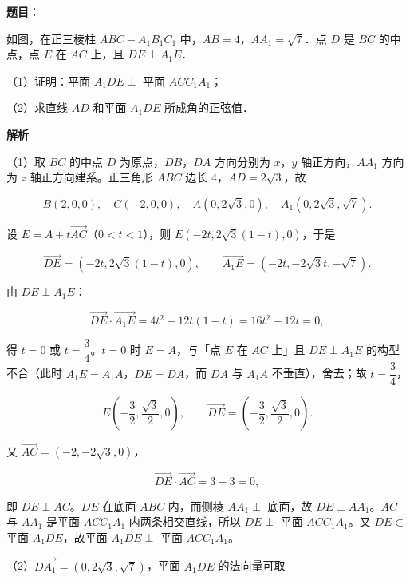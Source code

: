 \begin{answer}

\textbf{题目}：

如图，在正三棱柱 $ABC-A_1B_1C_1$ 中，$AB=4$，$AA_1=\sqrt7$．点 $D$ 是 $BC$ 的中点，点 $E$ 在 $AC$ 上，且 $DE\perp A_1E$．

（1）证明：平面 $A_1DE\perp$ 平面 $ACC_1A_1$；

（2）求直线 $AD$ 和平面 $A_1DE$ 所成角的正弦值．
\nopagebreak[4]
\begin{center}\end{center}
\nopagebreak[4]
\textbf{解析}

（1）取 $BC$ 的中点 $D$ 为原点，$DB$，$DA$ 方向分别为 $x$，$y$ 轴正方向，$AA_1$ 方向为 $z$ 轴正方向建系。正三角形 $ABC$ 边长 $4$，$AD=2\sqrt3$，故

\nopagebreak[4]
\[B(2,0,0),\quad C(-2,0,0),\quad A(0,2\sqrt3,0),\quad A_1(0,2\sqrt3,\sqrt7).\]

设 $E=A+t\overrightarrow{AC}$（$0<t<1$），则 $E\left(-2t,2\sqrt3(1-t),0\right)$，于是

\nopagebreak[4]
\[\overrightarrow{DE}=\left(-2t,2\sqrt3(1-t),0\right),\qquad \overrightarrow{A_1E}=\left(-2t,-2\sqrt3t,-\sqrt7\right).\]

由 $DE\perp A_1E$：

\nopagebreak[4]
\[\overrightarrow{DE}\cdot\overrightarrow{A_1E}=4t^2-12t(1-t)=16t^2-12t=0,\]

得 $t=0$ 或 $t=\dfrac34$。$t=0$ 时 $E=A$，与「点 $E$ 在 $AC$ 上」且 $DE\perp A_1E$ 的构型不合（此时 $A_1E=A_1A$，$DE=DA$，而 $DA$ 与 $A_1A$ 不垂直），舍去；故 $t=\dfrac34$，

\nopagebreak[4]
\[E\left(-\frac32,\frac{\sqrt3}{2},0\right),\qquad \overrightarrow{DE}=\left(-\frac32,\frac{\sqrt3}{2},0\right).\]

又 $\overrightarrow{AC}=(-2,-2\sqrt3,0)$，

\nopagebreak[4]
\[\overrightarrow{DE}\cdot\overrightarrow{AC}=3-3=0,\]

即 $DE\perp AC$。$DE$ 在底面 $ABC$ 内，而侧棱 $AA_1\perp$ 底面，故 $DE\perp AA_1$。$AC$ 与 $AA_1$ 是平面 $ACC_1A_1$ 内两条相交直线，所以 $DE\perp$ 平面 $ACC_1A_1$。又 $DE\subset$ 平面 $A_1DE$，故平面 $A_1DE\perp$ 平面 $ACC_1A_1$。

（2）$\overrightarrow{DA_1}=(0,2\sqrt3,\sqrt7)$，平面 $A_1DE$ 的法向量可取


\end{answer}

